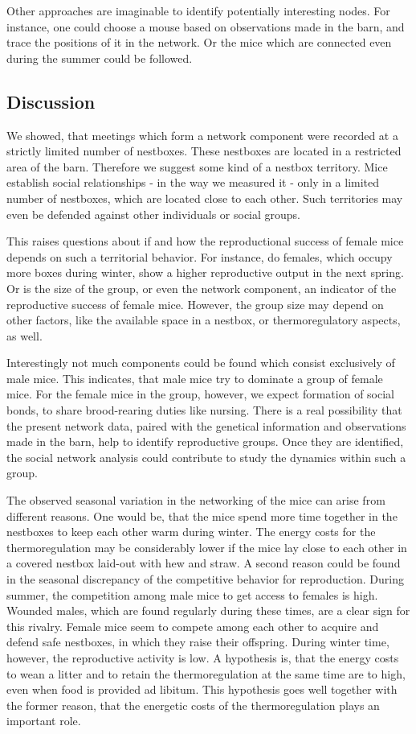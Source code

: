 Other approaches are imaginable to identify potentially interesting nodes. For instance, one could choose a mouse based on observations made in the barn, and trace the positions of it in the network. Or the mice which are connected even during the summer could be followed.

\subsection{Discussion}
\label{subsec:discussion}

We showed, that meetings which form a network component were recorded at a strictly limited number of nestboxes. These nestboxes are located in a restricted area of the barn. Therefore we suggest some kind of a nestbox territory. Mice establish social relationships - in the way we measured it - only in a limited number of nestboxes, which are located close to each other. Such territories may even be defended against other individuals or social groups.

This raises questions about if and how the reproductional success of female mice depends on such a territorial behavior. For instance, do females, which occupy more boxes during winter, show a higher reproductive output in the next spring. Or is the size of the group, or even the network component, an indicator of the reproductive success of female mice. However, the group size may depend on other factors, like the available space in a nestbox, or thermoregulatory aspects, as well.

Interestingly not much components could be found which consist exclusively of male mice. This indicates, that male mice try to dominate a group of female mice. For the female mice in the group, however, we expect formation of social bonds, to share brood-rearing duties like nursing. There is a real possibility that the present network data, paired with the genetical information and observations made in the barn, help to identify reproductive groups. Once they are identified, the social network analysis could contribute to study the dynamics within such a group.     

The observed seasonal variation in the networking of the mice can arise from different reasons. One would be, that the mice spend more time together in the nestboxes to keep each other warm during winter. The energy costs for the thermoregulation may be considerably lower if the mice lay close to each other in a covered nestbox laid-out with hew and straw. A second reason could be found in the seasonal discrepancy of the competitive behavior for reproduction. During summer, the competition among male mice to get access to females is high. Wounded males, which are found regularly during these times, are a clear sign for this rivalry. Female mice seem to compete among each other to acquire and defend safe nestboxes, in which they raise their offspring. During winter time, however, the reproductive activity is low. A hypothesis is, that the energy costs to wean a litter and to retain the thermoregulation at the same time are to high, even when food is provided ad libitum. This hypothesis goes well together with the former reason, that the energetic costs of the thermoregulation plays an important role.    


